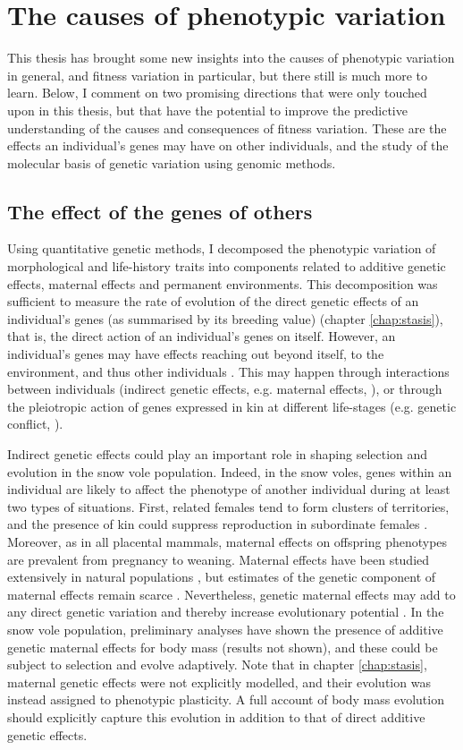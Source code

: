 \section{The causes of phenotypic variation}
This thesis has brought some new insights into the causes of phenotypic variation in general, and fitness variation in particular, but there still is much more to learn. Below, I comment on two promising directions that were only touched upon in this thesis, but that have the potential to improve the predictive understanding of the causes and consequences of fitness variation. These are the effects an individual's genes may have on other individuals, and the study of the molecular basis of genetic variation using genomic methods.

\subsection{The effect of the genes of others}
Using quantitative genetic methods, I decomposed the phenotypic variation of morphological and life-history traits into components related to additive genetic effects, maternal effects and permanent environments. This decomposition was sufficient to measure the rate of evolution of the direct genetic effects of an individual's genes (as summarised by its breeding value) (chapter \ref{chap:stasis}), that is, the direct action of an individual's genes on itself.
However, an individual's genes may have effects reaching out beyond itself, to the environment, and thus other individuals \parencite{Dawkins1982}. This may happen through interactions between individuals (indirect genetic effects, e.g. maternal effects, \cite{McAdam2014}), or through the pleiotropic action of genes expressed in kin at different life-stages (e.g. genetic conflict, \cite{Trivers1974}).

Indirect genetic effects could play an important role in shaping selection and evolution in the snow vole population. Indeed, in the snow voles, genes within an individual are likely to affect the phenotype of another individual during at least two types of situations. First, related females tend to form clusters of territories, and the presence of kin could suppress reproduction in subordinate females \parencite{Garcia-Navas2016}. Moreover, as in all placental mammals, maternal effects on offspring phenotypes are prevalent from pregnancy to weaning. 
Maternal effects have been studied extensively in natural populations \parencite{Wolf2009}, but estimates of the genetic component of maternal effects remain scarce \parencite{McAdam2014}. Nevertheless, genetic maternal effects may add to any direct genetic variation and thereby increase evolutionary potential \parencite{Mcglothlin2014, McAdam2014, Mcfarlane2015}. In the snow vole population, preliminary analyses have shown the presence of additive genetic maternal effects for body mass (results not shown), and these could be subject to selection and evolve adaptively. Note that in chapter \ref{chap:stasis}, maternal genetic effects were not explicitly modelled, and their evolution was instead assigned to phenotypic plasticity. A full account of body mass evolution should explicitly capture this evolution in addition to that of direct additive genetic effects. 

